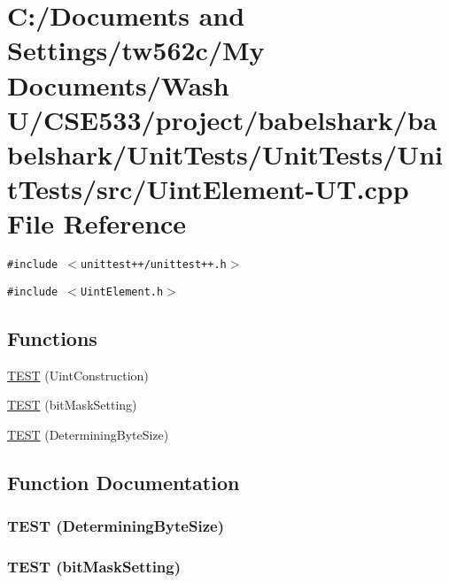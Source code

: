 \hypertarget{_uint_element-_u_t_8cpp}{
\section{C:/Documents and Settings/tw562c/My Documents/Wash U/CSE533/project/babelshark/babelshark/UnitTests/UnitTests/UnitTests/src/UintElement-UT.cpp File Reference}
\label{_uint_element-_u_t_8cpp}
}
{\tt \#include $<$unittest++/unittest++.h$>$}\par
{\tt \#include $<$UintElement.h$>$}\par
\subsection*{Functions}
\begin{CompactItemize}
\item 
\hyperlink{_uint_element-_u_t_8cpp_b99da3acb1cb4bdc85ae6d9697002027}{TEST} (UintConstruction)
\item 
\hyperlink{_uint_element-_u_t_8cpp_031f864544f7f673cf553e5ec39da40b}{TEST} (bitMaskSetting)
\item 
\hyperlink{_uint_element-_u_t_8cpp_8df34b85fabbe88e646166225fdd4b6f}{TEST} (DeterminingByteSize)
\end{CompactItemize}


\subsection{Function Documentation}
\hypertarget{_uint_element-_u_t_8cpp_8df34b85fabbe88e646166225fdd4b6f}{
\subsubsection[{TEST}]{\setlength{\rightskip}{0pt plus 5cm}TEST (DeterminingByteSize)}}
\label{_uint_element-_u_t_8cpp_8df34b85fabbe88e646166225fdd4b6f}


\hypertarget{_uint_element-_u_t_8cpp_031f864544f7f673cf553e5ec39da40b}{
\subsubsection[{TEST}]{\setlength{\rightskip}{0pt plus 5cm}TEST (bitMaskSetting)}}
\label{_uint_element-_u_t_8cpp_031f864544f7f673cf553e5ec39da40b}


